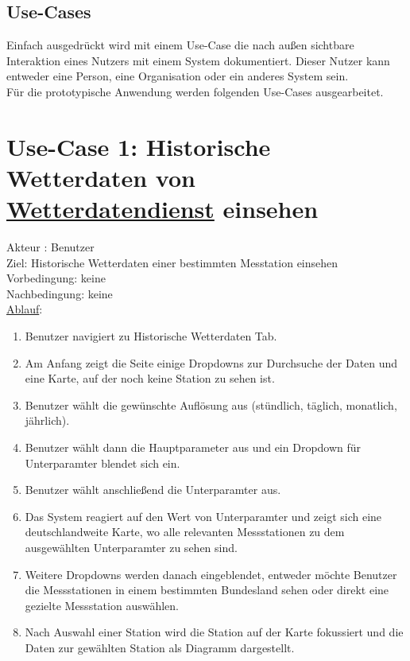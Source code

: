 \documentclass[a4paper,12pt]{scrreprt}
\begin{document}
\subsection{Use-Cases}
Einfach ausgedrückt wird mit einem Use-Case die nach außen sichtbare Interaktion eines Nutzers mit einem System dokumentiert. Dieser Nutzer kann entweder eine Person, eine Organisation oder ein anderes System sein.\\
Für die prototypische Anwendung werden folgenden Use-Cases ausgearbeitet.
\section*{\small \textbf{Use-Case 1: Historische Wetterdaten von \href{https://wetterdienst.readthedocs.io/en/latest/} {Wetterdatendienst} einsehen}}
Akteur : Benutzer\\
Ziel: Historische Wetterdaten einer bestimmten Messtation einsehen\\
Vorbedingung: keine\\
Nachbedingung: keine\\
\underline{Ablauf}:
\begin{enumerate}
\item Benutzer navigiert zu Historische Wetterdaten Tab.
\item Am Anfang zeigt die Seite einige Dropdowns zur Durchsuche der Daten und eine Karte, auf der noch keine Station zu sehen ist.
\item Benutzer wählt die gewünschte Auflösung aus (stündlich, täglich, monatlich, jährlich).
\item Benutzer wählt dann die Hauptparameter aus und ein Dropdown für Unterparamter blendet sich ein.
\item Benutzer wählt anschließend die Unterparamter aus.
\item Das System reagiert auf den Wert von Unterparamter und zeigt sich eine deutschlandweite Karte, wo alle relevanten Messstationen zu dem ausgewählten Unterparamter zu sehen sind. 
\item Weitere Dropdowns werden danach eingeblendet, entweder möchte Benutzer die Messstationen in einem bestimmten Bundesland sehen oder direkt eine gezielte Messstation auswählen.
\item Nach Auswahl einer Station wird die Station auf der Karte fokussiert und die Daten zur gewählten Station als Diagramm dargestellt. 
\end{enumerate}
\end{document}
